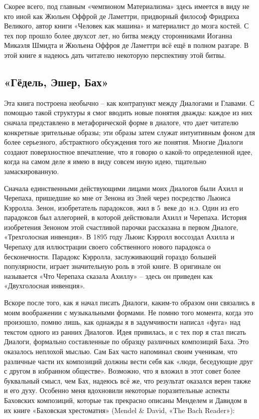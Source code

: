 \documentclass[../main.tex]{subfiles}
\begin{document}
Скорее всего, под главным «чемпионом Материализма» здесь имеется в виду не кто иной как Жюльен Оффрой де Ламеттри, придворный философ Фридриха Великого, автор книги «Человек как машина» и материалист до мозга костей. С тех пор прошло более двухсот лет, но битва между сторонниками Иоганна Микаэля Шмидта и Жюльена Оффроя де Ламеттри всё ещё в полном разгаре. В этой книге я надеюсь дать читателю некоторую перспективу этой битвы.


\subsection{«Гёдель, Эшер, Бах»}

Эта книга построена необычно \--- как контрапункт между Диалогами и Главами. С помощью такой структуры я смог вводить новые понятия дважды: каждое из них сначала представлено в метафорической форме в диалоге, что дает читателю конкретные зрительные образы; эти образы затем служат интуитивным фоном для более серьезного, абстрактного обсуждения того же понятия. Многие Диалоги создают поверхностное впечатление, что я говорю о какой-то определенной идее, когда на самом деле я имею в виду совсем иную идею, тщательно замаскированную.

Сначала единственными действующими лицами моих Диалогов были Ахилл и Черепаха, пришедшие ко мне от Зенона из Элей через посредство Льюиса Кэрролла. Зенон, изобретатель парадоксов, жил в 5~веке до~н.э. Один из его парадоксов был аллегорией, в которой действовали Ахилл и Черепаха. История изобретения Зеноном этой счастливой парочки рассказана в первом Диалоге, «Трехголосная инвенция». В 1895 году Льюис Кэрролл воссоздал Ахилла и Черепаху для иллюстрации своего собственного нового парадокса о бесконечности. Парадокс Кэрролла, заслуживающий гораздо большей популярности, играет значительную роль в этой книге. В оригинале он называется «Что Черепаха сказала Ахиллу» \--- здесь он приведен как «Двухголосная инвенция».

Вскоре после того, как я начал писать Диалоги, каким-то образом они связались в моим воображении с музыкальными формами. Не помню того момента, когда это произошло, помню лишь, как однажды я в задумчивости написал «фуга» над текстом одного из ранних Диалогов. Идея привилась, и с тех пор я стал писать Диалоги, формально составленные по образцу различных композиций Баха. Это оказалось неплохой мыслью. Сам Бах часто напоминал своим ученикам, что различные части их композиций должны вести себя как «люди, беседующие друг с другом в избранном обществе». Возможно, что я вложил в этот совет более буквальный смысл, чем Бах, надеюсь всё же, что результат оказался верен также и его духу. Особенно меня вдохновили некоторые поразительные аспекты Баховских композиций, которые так прекрасно описаны Менделем и Давидом в их книге «Баховская хрестоматия» (Mendel \& David, «The Bach Reader»):
\end{document}
